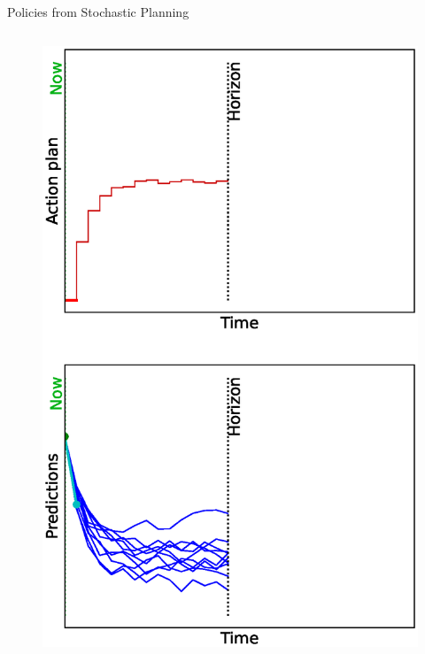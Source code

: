 \documentclass[lecture]{beamer}
\begin{document}
\begin{frame}{\normalsize Policies from Stochastic Planning}
\footnotesize

\begin{columns}

  \begin{overlayarea}{\textwidth}{0.9\textheight}
    \begin{figure}
    \newcommand{\FS}{1}
      \centering
        {%
          \includegraphics[width=\FS\textwidth,clip]{Codes/MPC/MPCMC0.eps}
        }%
        {%
}
\end{figure}
\end{overlayarea}
\end{columns}
\end{frame}
\end{document}
